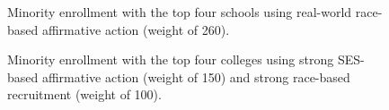 \begin{figure}[p]
  \centering
  \hfill%
  \caption{Minority enrollment with the top four schools using real-world race-based affirmative action (weight of 260).}
  \label{fig:c2}
\end{figure}

\begin{figure}[p]
  \centering
  \hfill%
  \caption{Minority enrollment with the top four colleges using strong SES-based affirmative action (weight of 150) and strong race-based recruitment (weight of 100).}
  \label{fig:c4}
\end{figure}


